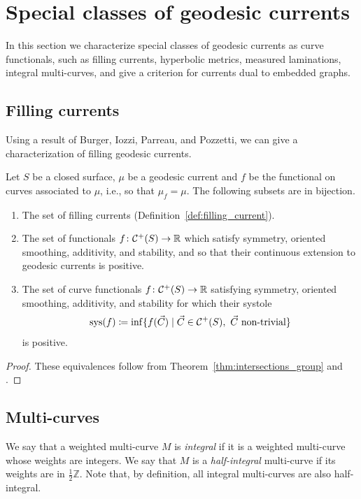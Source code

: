 \section{Special classes of geodesic currents}
\label{sec:special-classes}

In this section we characterize special classes of geodesic currents
as curve functionals, such as filling currents, hyperbolic metrics,
measured laminations, integral multi-curves, and give a criterion for
currents dual to embedded graphs.

\subsection{Filling currents}
\label{subsec:filling}
Using a result of Burger, Iozzi, Parreau, and Pozzetti, we can give a
characterization of filling geodesic currents.

\begin{corollary}\label{cor:systole}
  Let $S$ be a closed surface,
  $\mu$ be a geodesic current and $f$ be the functional on curves associated
  to $\mu$, i.e., so that $\mu_f=\mu$. The following subsets are in
  bijection.
\begin{enumerate}
    \item The set of filling currents (Definition~\ref{def:filling_current}).
    \item The set of functionals $f \colon \mathcal{C}^+(S) \to
      \mathbb{R}$ which satisfy symmetry, oriented smoothing,
      additivity, and stability, and so that their continuous extension to geodesic currents is positive.
    \item The set of curve functionals $f \colon \mathcal{C}^+(S) \to
      \mathbb{R}$ satisfying symmetry, oriented smoothing, additivity,
      and stability for which their systole
      \[\operatorname{sys}(f)\coloneqq \inf \{ f(\vec C) \mid \vec C \in \mathcal{C}^+(S),\ \vec C \mbox{ non-trivial} \}\]
      is
      positive.
\end{enumerate}
\end{corollary}
\begin{proof}
These equivalences follow from Theorem~\ref{thm:intersections_group} and \cite[Theorem~1.3]{BIPP21:Systoles}.
\end{proof}

\subsection{Multi-curves}

We say that a weighted multi-curve $M$ is \emph{integral}
if it is a weighted multi-curve whose weights are integers. We say that
$M$ is a \emph{half-integral} multi-curve if its weights are in
$\frac{1}{2}\mathbb{Z}$. Note that, by definition, all integral
multi-curves are also half-integral.


